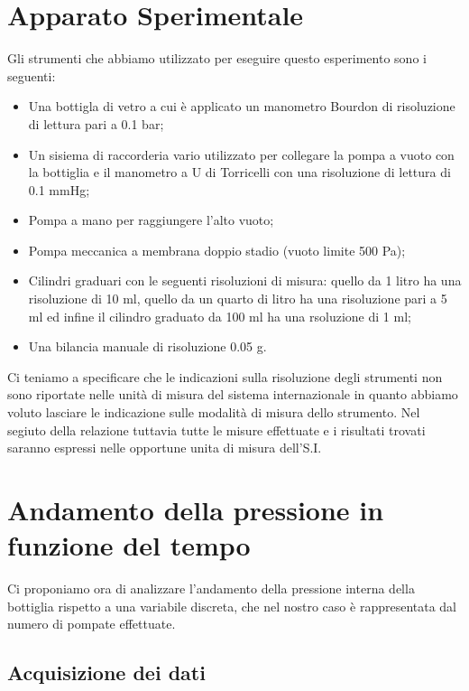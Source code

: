 \section{Apparato Sperimentale}

Gli strumenti che abbiamo utilizzato per eseguire questo esperimento sono i seguenti:
\begin{itemize}
	\item{Una bottigla di vetro a cui è applicato un manometro Bourdon di risoluzione di lettura pari a 0.1 bar;}
	\item{Un sisiema di raccorderia vario utilizzato per collegare la pompa a vuoto con la bottiglia e il manometro a U di Torricelli con una risoluzione di lettura di 0.1 mmHg;}
	\item{Pompa a mano per raggiungere l'alto vuoto;}
	\item{Pompa meccanica a membrana doppio stadio (vuoto limite 500 Pa);}
	\item{Cilindri graduari con le seguenti risoluzioni di misura: quello da 1 litro ha una risoluzione di 10 ml, quello da un quarto di litro ha una risoluzione pari a 5 ml ed infine il cilindro graduato da 100 ml ha una rsoluzione di 1 ml;}
	\item{Una bilancia manuale di risoluzione 0.05 g.}
\end{itemize}

Ci teniamo a specificare che le indicazioni sulla risoluzione degli strumenti non sono riportate nelle unità di misura del sistema internazionale in quanto abbiamo voluto lasciare le indicazione sulle modalità di misura dello strumento. Nel segiuto della relazione tuttavia tutte le misure effettuate e i risultati trovati saranno espressi nelle opportune unita di misura dell'S.I.

\section{Andamento della pressione in funzione del tempo}

Ci proponiamo ora di analizzare l'andamento della pressione interna della bottiglia rispetto a una variabile discreta, che nel nostro caso è rappresentata dal numero di pompate effettuate.

\subsection{Acquisizione dei dati}

